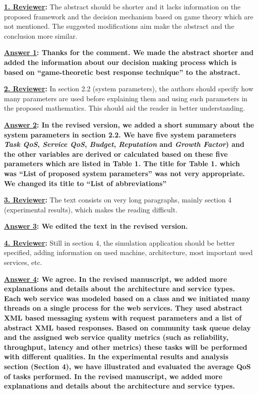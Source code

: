 \documentclass[times, 12pt,a4paper]{article}
\begin{document}
\vspace{0.5cm} \textbf{\underline{1. Reviewer}:} The abstract should be shorter and it lacks information on the proposed framework and the decision mechanism based on game theory which are not mentioned. The suggested modifications aim make the abstract and the conclusion more similar.

\vspace{0.2cm}\textbf{\underline{Answer 1}: Thanks for the
comment. We made the abstract shorter and added the information about our decision making process which is based on ``game-theoretic best response technique'' to the abstract.}

\vspace{0.5cm}\textbf{\underline{2. Reviewer}:}  In section 2.2 (system parameters), the authors should specify how many parameters are used before explaining them and using such parameters in the proposed mathematics. This should aid the reader in better understanding.

\vspace{0.2cm}\textbf{\underline{Answer 2}: In the revised version, we added a short summary about the system parameters in section 2.2. We have five system parameters \emph{Task QoS}, \emph{Service QoS}, \emph{Budget}, \emph{Reputation} and \emph{Growth Factor}) and the other variables are derived or calculated based on these five parameters which are listed in Table 1. The title for Table 1. which was ``List of proposed system parameters'' was not very appropriate. We changed its title to ``List of abbreviations''}


\vspace{0.5cm}\textbf{\underline{3. Reviewer}:} The text consists on very long paragraphs, mainly section 4 (experimental results), which makes the reading difficult.

\vspace{0.2cm}\textbf{\underline{Answer 3}: We edited the text in the revised version.}


\vspace{0.5cm}\textbf{\underline{4. Reviewer}:} Still in section 4, the simulation application should be better specified, adding information on used machine, architecture, most important used services, etc.

\vspace{0.2cm}\textbf{\underline{Answer 4}: We agree. In the revised manuscript, we added more explanations and details about the architecture and service types. Each web service was modeled based on a class and we initiated many threads on a single process for the web services. They used abstract XML based messaging system with request parameters and a list of abstract XML based responses. Based on community task queue delay and the assigned web service quality metrics (such as reliability, throughput, latency and other metrics) these tasks will be performed with different qualities. In the experimental results and analysis section (Section 4), we have illustrated and
evaluated the average QoS of tasks performed. In the revised manuscript, we added more explanations and details about the architecture and service types.
}
\end{document}
